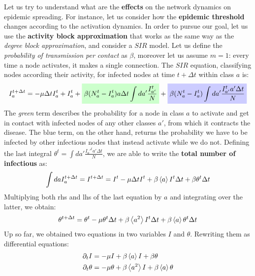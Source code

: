 \documentclass[../main/main.tex]{subfiles}
\begin{document}
Let us try to understand what are the \textbf{effects} on the network dynamics on epidemic spreading. For instance, let us consider how the \textbf{epidemic threshold} changes according to the activation dynamics.
In order to pursue our goal, let us use the \textbf{activity block approximation} that works as the same way as the \textit{degree block approximation}, and consider a $SIR$ model.
Let us define the \textit{probability of transmission per contact} as $\beta$, moreover let us assume $m=1$: every time a node activates, it makes a single connection. The $SIR$ equation, classifying nodes according their activity, for infected nodes at time $t + \Delta t$ within class $a$ is:
\begin{equation}
   I_a^{t+\Delta t} = -\mu \Delta t I^t_a + I^t_a + \mathcolorbox{green!20}{\beta(N_a^t - I_a^t) a \Delta t \int da' \frac{I_{a'}^t}{N} } +  \mathcolorbox{blue!20}{\beta (N_a^t - I_a^t)\int da' \frac{I_{a'}^t a' \Delta  t}{N}}
\end{equation}
The \textit{green} term describes the probability for a node in class $a$ to activate and get in contact with infected nodes of any other classes $a'$, from which it contracts the disease. The blue term, on the other hand, returns the probability we have to be infected by other infectious nodes that instead activate while we do not.
Defining the last integral $\theta^t = \int da' \frac{I_a'^t a' \Delta  t}{N} $, we are able to write the \textbf{total number of infectious} as:
\begin{equation}
    \int da I_a^{t + \Delta t} = I^{t + \Delta t} = I^t - \mu \Delta t I^t + \beta \expval{a} I^t \Delta t + \beta \theta^t \Delta t
\end{equation}
Multiplying both rhs and lhs of the last equation by $a$ and integrating over the latter, we obtain:
\begin{equation}
    \theta^{t + \Delta t} = \theta^{t} - \mu \theta^t \Delta t + \beta \expval{a^2} I^t \Delta t + \beta \expval{a} \theta^t \Delta t
\end{equation}
Up so far, we obtained two equations in two variables $I$ and $\theta$. Rewriting them as differential equations:
\begin{subequations}
\begin{align}
    \partial_t I &= -\mu I + \beta \expval{a} I + \beta \theta\\
    \partial_t \theta &= -\mu \theta + \beta \expval{a^2}I + \beta \expval{a}\theta
\end{align}
\end{subequations}
\end{document}

